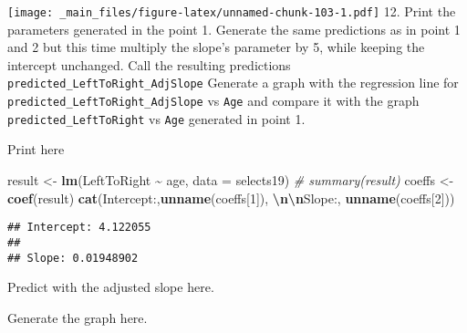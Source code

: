 \documentclass[
]{book}
\newenvironment{Shaded}{\begin{snugshade}}{\end{snugshade}}
\newcommand{\AttributeTok}[1]{\textcolor[rgb]{0.13,0.29,0.53}{#1}}
\newcommand{\CommentTok}[1]{\textcolor[rgb]{0.56,0.35,0.01}{\textit{#1}}}
\newcommand{\DecValTok}[1]{\textcolor[rgb]{0.00,0.00,0.81}{#1}}
\newcommand{\FunctionTok}[1]{\textcolor[rgb]{0.13,0.29,0.53}{\textbf{#1}}}
\newcommand{\NormalTok}[1]{#1}
\newcommand{\OtherTok}[1]{\textcolor[rgb]{0.56,0.35,0.01}{#1}}
\newcommand{\SpecialCharTok}[1]{\textcolor[rgb]{0.81,0.36,0.00}{\textbf{#1}}}
\newcommand{\StringTok}[1]{\textcolor[rgb]{0.31,0.60,0.02}{#1}}
\begin{document}
\texttt{[image: \_main\_files/figure-latex/unnamed-chunk-103-1.pdf]}
12. Print the parameters generated in the point 1. Generate the same predictions as in point 1 and 2 but this time multiply the slope's parameter by 5, while keeping the intercept unchanged. Call the resulting predictions \texttt{predicted\_LeftToRight\_AdjSlope} Generate a graph with the regression line for \texttt{predicted\_LeftToRight\_AdjSlope} vs \texttt{Age} and compare it with the graph \texttt{predicted\_LeftToRight} vs \texttt{Age} generated in point 1.

Print here

\begin{Shaded}
\begin{Highlighting}[]
\NormalTok{result }\OtherTok{\textless{}{-}} \FunctionTok{lm}\NormalTok{(LeftToRight }\SpecialCharTok{\textasciitilde{}}\NormalTok{ age, }\AttributeTok{data =}\NormalTok{ selects19)}
\CommentTok{\# summary(result)}
\NormalTok{coeffs }\OtherTok{\textless{}{-}} \FunctionTok{coef}\NormalTok{(result)}
\FunctionTok{cat}\NormalTok{(}\StringTok{\textquotesingle{}Intercept:\textquotesingle{}}\NormalTok{,}\FunctionTok{unname}\NormalTok{(coeffs[}\DecValTok{1}\NormalTok{]), }\StringTok{\textquotesingle{}}\SpecialCharTok{\textbackslash{}n\textbackslash{}n}\StringTok{Slope:\textquotesingle{}}\NormalTok{, }\FunctionTok{unname}\NormalTok{(coeffs[}\DecValTok{2}\NormalTok{]))}
\end{Highlighting}
\end{Shaded}

\begin{verbatim}
## Intercept: 4.122055 
## 
## Slope: 0.01948902
\end{verbatim}

Predict with the adjusted slope here.

\begin{Shaded}
\end{Shaded}

Generate the graph here.
\end{document}
